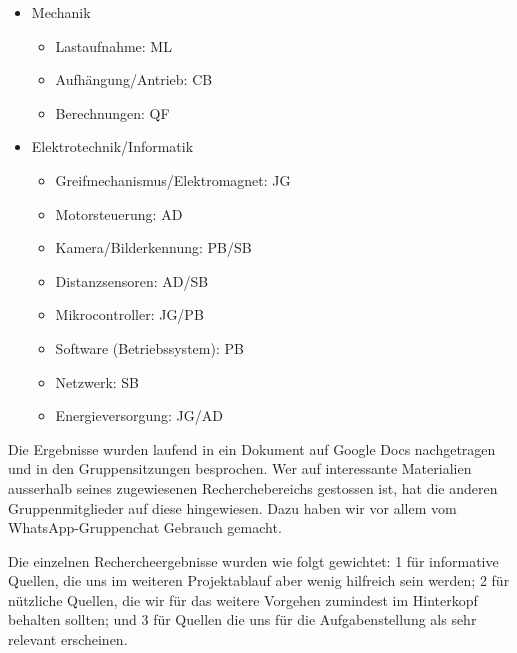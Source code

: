\documentclass[a4paper,11pt]{scrartcl}
\begin{document}
\begin{itemize}
    \item{Mechanik
        \begin{itemize}
            \item{Lastaufnahme: ML}
            \item{Aufhängung/Antrieb: CB}
            \item{Berechnungen: QF}
        \end{itemize}
    }
    \item{Elektrotechnik/Informatik
        \begin{itemize}
            \item{Greifmechanismus/Elektromagnet: JG}
            \item{Motorsteuerung: AD}
            \item{Kamera/Bilderkennung: PB/SB}
            \item{Distanzsensoren: AD/SB}
            \item{Mikrocontroller: JG/PB}
            \item{Software (Betriebssystem): PB}
            \item{Netzwerk: SB}
            \item{Energieversorgung: JG/AD}
        \end{itemize}
    }
\end{itemize}

Die Ergebnisse wurden laufend in ein Dokument auf Google Docs nachgetragen und in den Gruppensitzungen besprochen. Wer auf interessante Materialien ausserhalb seines zugewiesenen Recherchebereichs gestossen ist, hat die anderen Gruppenmitglieder auf diese hingewiesen. Dazu haben wir vor allem vom WhatsApp-Gruppenchat Gebrauch gemacht.

Die einzelnen Rechercheergebnisse wurden wie folgt gewichtet: 1 für informative Quellen, die uns im weiteren Projektablauf aber wenig hilfreich sein werden; 2 für nützliche Quellen, die wir für das weitere Vorgehen zumindest im Hinterkopf behalten sollten; und 3 für Quellen die uns für die Aufgabenstellung als sehr relevant erscheinen.
\end{document}
